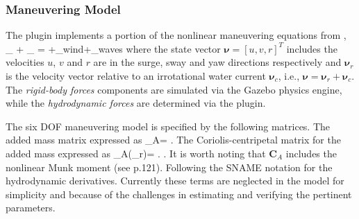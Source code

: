 \documentclass[11pt]{article}
\begin{document}
\subsubsection{Maneuvering Model}
The plugin implements a portion of the nonlinear maneuvering equations from \cite{fossen11handbook}, 
\beqn
{}_ +
_
= \bm{\tau}+\bm{\tau}_{wind}+\bm{\tau}_{waves}
\label{e:fossenmodel}
\eeqn
where the state vector $\bm{\nu}=[u,v,r]^T$ includes the velocities $u$, $v$ and $r$ are in the surge, sway and yaw directions respectively and  $\bm{\nu}_r$ is the velocity vector relative to an irrotational water current $\bm{\nu}_c$, i.e., $\bm{\nu}=\bm{\nu}_r+\bm{\nu}_c$.
The \emph{rigid-body forces} components are simulated via the Gazebo physics engine, while the \emph{hydrodynamic forces} are determined via the plugin.


The six DOF maneuvering model is specified by the following matrices. The added mass matrix expressed as 
\beqn
{}_{A}= .
\eeqn
The Coriolis-centripetal matrix for the added mass expressed as 
\beqn
{}_{A}(\bm{\nu}_r)= .
\eeqn.
It is worth noting that $\bm{C}_A$ includes the nonlinear Munk moment (see \cite{fossen11handbook} p.121).  Following \cite{fossen11handbook} the SNAME notation for the hydrodynamic derivatives.  Currently these terms are neglected in the model for simplicity and because of the challenges in estimating and verifying the pertinent parameters.
\end{document}
